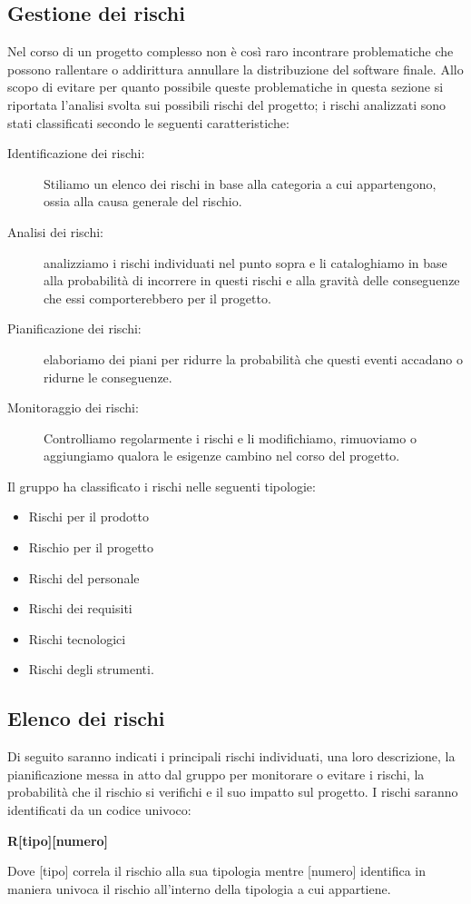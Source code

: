 \documentclass[../piano-di-progetto.tex]{subfiles}
\begin{document}
\subsection{Gestione dei rischi}%
\label{sub:gestione_dei_rischi}
Nel corso di un progetto complesso non è così raro incontrare problematiche che possono rallentare o addirittura annullare la distribuzione del software finale.
Allo scopo di evitare per quanto possibile queste problematiche in questa sezione si riportata l'analisi svolta sui possibili rischi del progetto; i rischi analizzati sono stati classificati secondo le seguenti caratteristiche:
\begin{description}
  \item[Identificazione dei rischi:] Stiliamo un elenco dei rischi in base alla categoria a cui appartengono, ossia alla causa generale del rischio.
  \item[Analisi dei rischi:] analizziamo i rischi individuati nel punto sopra e li cataloghiamo in base alla probabilità di incorrere in questi rischi e alla gravità delle conseguenze che essi comporterebbero per il progetto.
  \item[Pianificazione dei rischi:] elaboriamo dei piani per ridurre la probabilità che questi eventi accadano o ridurne le conseguenze.
  \item[Monitoraggio dei rischi:] Controlliamo regolarmente i rischi e li modifichiamo, rimuoviamo o aggiungiamo qualora le esigenze cambino nel corso del progetto.
\end{description}
Il gruppo ha classificato i rischi nelle seguenti tipologie:
\begin{itemize}
  \item Rischi per il prodotto
  \item Rischio per il progetto
  \item Rischi del personale
  \item Rischi dei requisiti
  \item Rischi tecnologici
  \item Rischi degli strumenti.
\end{itemize}

\subsection{Elenco dei rischi}%
\label{sub:elenco_dei_rischi}
Di seguito saranno indicati i principali rischi individuati, una loro descrizione, la pianificazione messa in atto dal gruppo per monitorare o evitare i rischi, la probabilità che il rischio si verifichi e il suo impatto sul progetto.
I rischi saranno identificati da un codice univoco:
\begin{center}
  \textbf{R[tipo][numero]}
\end{center}
Dove [tipo] correla il rischio alla sua tipologia mentre [numero] identifica in maniera univoca il rischio all'interno della tipologia a cui appartiene.
\end{document}

